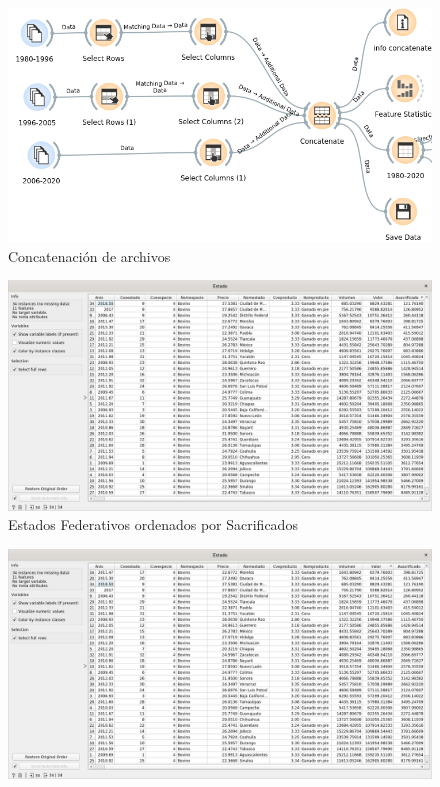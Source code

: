 \begin{enumerate}[1.]
        \begin{enumerate}[Obj{e}t{i}vo 1.]
            
            \begin{figure}
            \centering
            \includegraphics[scale = 0.5]{imagenes/orange1.png}
            \caption{Concatenación de archivos}
            \label{concatenacion}
            \end{figure}
            \begin{figure}
                \centering
                \includegraphics[scale = 0.3]{imagenes/estadosporasacrificado.png}
                \caption{Estados Federativos ordenados por Sacrificados}
                \label{tablesacrificados}
            \end{figure}
            \begin{figure}
                \centering
                \includegraphics[scale = 0.3]{imagenes/estadosporvalor.png}

\end{figure}
\end{enumerate}
\end{enumerate}

